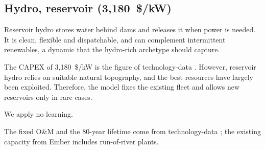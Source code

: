 \subsection{Hydro, reservoir (3,180~\$/kW)}\label{sec:hydro}
Reservoir hydro stores water behind dams and releases it when power is needed.
It is clean, flexible and dispatchable, and can complement intermittent renewables, a dynamic that the hydro-rich archetype should capture.

The CAPEX of 3,180~\$/kW is the figure of technology-data \citep{technologydata}.
However, reservoir hydro relies on suitable natural topography, and the best resources have largely been exploited.
Therefore, the model fixes the existing fleet and allows new reservoirs only in rare cases.

We apply no learning.

The fixed O\&M and the 80-year lifetime come from technology-data \citep{technologydata}; the existing capacity from Ember includes run-of-river plants.

